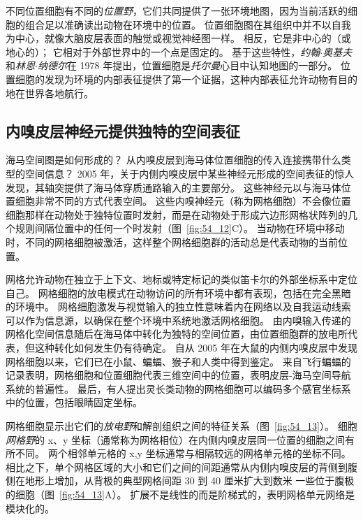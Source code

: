 不同位置细胞有不同的\textit{位置野}，它们共同提供了一张环境地图，因为当前活跃的细胞的组合足以准确读出动物在环境中的位置。
位置细胞图在其组织中并不以自我为中心，就像大脑皮层表面的触觉或视觉神经图一样。
相反，它是非中心的（或地心的）； 它相对于外部世界中的一个点是固定的。
基于这些特性，\textit{约翰$\cdot$奥基夫}和\textit{林恩$\cdot$纳德尔}在 1978 年提出，位置细胞是\textit{托尔曼}心目中认知地图的一部分。
位置细胞的发现为环境的内部表征提供了第一个证据，这种内部表征允许动物有目的地在世界各地航行。



\subsection{内嗅皮层神经元提供独特的空间表征}

海马空间图是如何形成的？
从内嗅皮层到海马体位置细胞的传入连接携带什么类型的空间信息？
2005 年，关于内侧内嗅皮层中某些神经元形成的空间表征的惊人发现，其轴突提供了海马体穿质通路输入的主要部分。
这些神经元以与海马体位置细胞非常不同的方式代表空间。
这些内嗅神经元（称为网格细胞）不会像位置细胞那样在动物处于独特位置时发射，而是在动物处于形成六边形网格状阵列的几个规则间隔位置中的任何一个时发射（图~\ref{fig:54_12}C）。
当动物在环境中移动时，不同的网格细胞被激活，这样整个网格细胞群的活动总是代表动物的当前位置。


网格允许动物在独立于上下文、地标或特定标记的类似笛卡尔的外部坐标系中定位自己。
网格细胞的放电模式在动物访问的所有环境中都有表现，包括在完全黑暗的环境中。
网格细胞激发与视觉输入的独立性意味着内在网络以及自我运动线索可以作为信息源，以确保在整个环境中系统地激活网格细胞。
由内嗅输入传递的网格化空间信息随后在海马体中转化为独特的空间位置，由位置细胞群的放电所代表，但这种转化如何发生仍有待确定。
自从 2005 年在大鼠的内侧内嗅皮层中发现网格细胞以来，它们已在小鼠、蝙蝠、猴子和人类中得到鉴定。
来自飞行蝙蝠的记录表明，网格细胞和位置细胞代表三维空间中的位置，表明皮层-海马空间导航系统的普遍性。
最后，有人提出灵长类动物的网格细胞可以编码多个感官坐标系中的位置，包括眼睛固定坐标。


网格细胞显示出它们的\textit{放电野}和解剖组织之间的特征关系（图~\ref{fig:54_13}）。
细胞\textit{网格野}的 x、y 坐标（通常称为网格相位）在内侧内嗅皮层同一位置的细胞之间有所不同。
两个相邻单元格的 x,y 坐标通常与相隔较远的网格单元格的坐标不同。
相比之下，单个网格区域的大小和它们之间的间距通常从内侧内嗅皮层的背侧到腹侧在地形上增加，从背极的典型网格间距 30 到 40 厘米扩大到数米 一些位于腹极的细胞（图~\ref{fig:54_13}A）。
扩展不是线性的而是阶梯式的，表明网格单元网络是模块化的。


